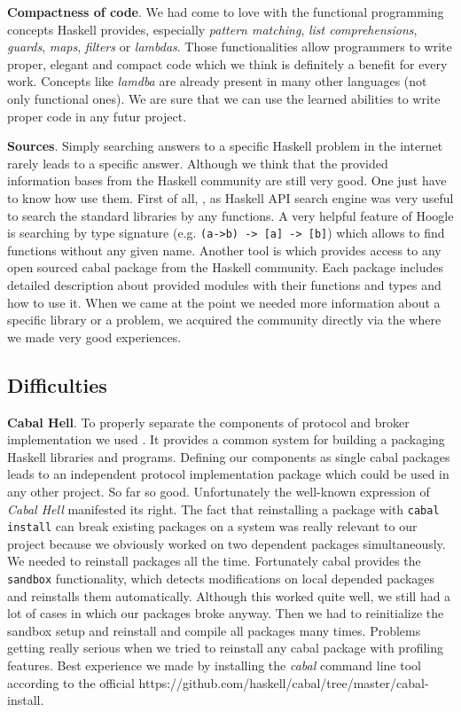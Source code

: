 {\bf Compactness of code}. We had come to love with the functional
programming concepts Haskell provides, especially \textit{pattern matching}, \textit{list
comprehensions}, \textit{guards}, \textit{maps}, \textit{filters} or
\textit{lambdas}. Those functionalities allow programmers to write proper,
elegant and compact code which we think is definitely a benefit for every
work. Concepts like \textit{lamdba} are already present in many other
languages (not only functional ones). We are sure that we can use the learned abilities
to write proper code in any futur project. 

{\bf Sources}. Simply searching answers to a specific Haskell problem in the
internet rarely leads to a specific answer. Although we think that the provided
information bases from the Haskell community are still very good. One just have
to know how use them. First of all,
, as Haskell API search engine
was very useful to search the standard libraries by any functions. A very
helpful feature of Hoogle is searching by type signature (e.g.
\lstinline{(a->b) -> [a] -> [b]}) which allows to find functions without any
given name. Another tool is 
which provides access to any open sourced cabal package from the Haskell
community. Each package includes detailed description about provided modules
with their functions and types and how to use it. When we came at the point we
needed more information about a specific library or a problem, we acquired the
community directly via the  where we made very good
experiences.

\subsection{Difficulties} {\bf Cabal Hell}. To properly separate the components
of protocol and broker
implementation  we used .
It provides a common system for building a packaging Haskell libraries and
programs. Defining our components as single cabal packages leads to an
independent protocol implementation package which could be used in any other
project. So far so good. Unfortunately the well-known expression of
\textit{Cabal Hell} manifested its right. The fact that reinstalling a package
with \lstinline{cabal install} can break existing packages on a system was
really relevant to our project because we obviously worked on two dependent
packages simultaneously. We needed to reinstall packages all the time.
Fortunately cabal provides the \lstinline{sandbox} functionality, which detects
modifications on local depended packages and reinstalls them automatically.
Although this worked quite well, we still had a lot of cases in which our
packages broke anyway. Then we had to reinitialize the sandbox setup and
reinstall and compile all packages many times. Problems getting really serious
when we tried to reinstall any cabal package with profiling features. Best
experience we made by installing the \textit{cabal} command line tool according
to the official 
{https://github.com/haskell/cabal/tree/master/cabal-install}.

